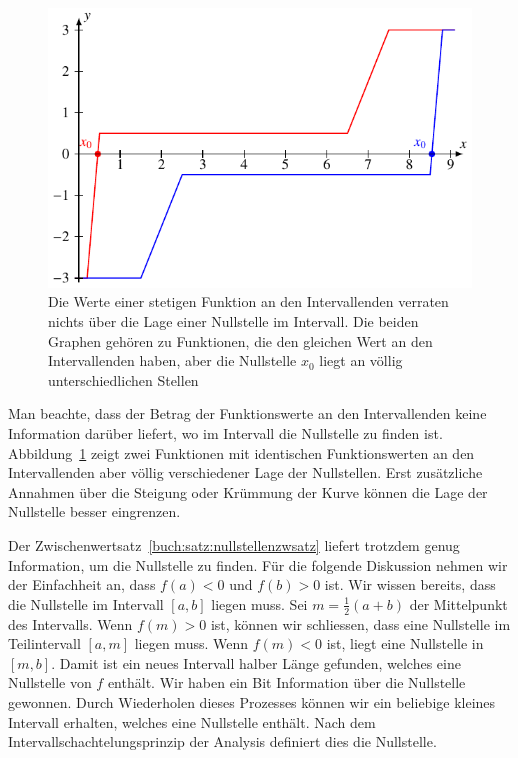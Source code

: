 \begin{figure}
\centering
\includegraphics{chapters/20-gleichungen/figures/stufe.pdf}
\caption{Die Werte einer stetigen Funktion an den Intervallenden verraten
nichts über die Lage einer Nullstelle im Intervall.
Die beiden Graphen gehören zu Funktionen, die den gleichen Wert an den
Intervallenden haben, aber die Nullstelle $x_0$ liegt an völlig
unterschiedlichen Stellen
\label{buch:figure:stufe}}
\end{figure}

Man beachte, dass der Betrag der Funktionswerte an den Intervallenden keine
Information darüber liefert, wo im Intervall die Nullstelle zu finden ist.
Abbildung~\ref{buch:figure:stufe} zeigt zwei Funktionen mit identischen
Funktionswerten an den Intervallenden aber völlig verschiedener Lage
der Nullstellen.
Erst zusätzliche Annahmen über die Steigung oder Krümmung der Kurve können
die Lage der Nullstelle besser eingrenzen.
%
%

Der Zwischenwertsatz~\ref{buch:satz:nullstellenzwsatz} liefert trotzdem
genug Information, um die Nullstelle zu finden.
Für die folgende Diskussion nehmen wir der Einfachheit an, dass $f(a)<0$
und $f(b)>0$ ist.
Wir wissen bereits, dass die Nullstelle im Intervall $[a,b]$ liegen muss.
Sei $m=\frac12(a+b)$ der Mittelpunkt des Intervalls.
Wenn $f(m) > 0$ ist, können wir schliessen, dass eine Nullstelle im
Teilintervall $[a,m]$ liegen muss.
Wenn $f(m) <0$ ist, liegt eine Nullstelle in $[m,b]$.
Damit ist ein neues Intervall halber Länge gefunden, welches eine
Nullstelle von $f$ enthält.
Wir haben ein Bit Information über die Nullstelle gewonnen.
Durch Wiederholen dieses Prozesses können wir ein beliebige kleines
Intervall erhalten, welches eine Nullstelle enthält.
Nach dem Intervallschachtelungsprinzip der Analysis definiert dies
die Nullstelle.
%

